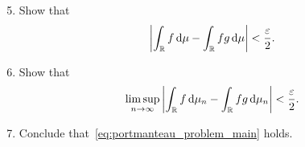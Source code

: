 \begin{problem}
\begin{enumerate}[label={(\alph*)}]
\setcounter{enumi}{4}
\item Show that
\[
	\left|\int_{\mathbb R} f \, \mathrm{d} \mu - \int_{\mathbb R} fg \, \mathrm{d} \mu\right| < \frac{\varepsilon}{2}.
\]
\item Show that
\[
	\limsup_{n \to \infty} \left|\int_{\mathbb R} f \, \mathrm{d} \mu_n - \int_{\mathbb R} fg \, \mathrm{d} \mu_n\right| < \frac{\varepsilon}{2}.
\]
\item Conclude that~\eqref{eq:portmanteau_problem_main} holds.
\end{enumerate}

%
\end{problem}

